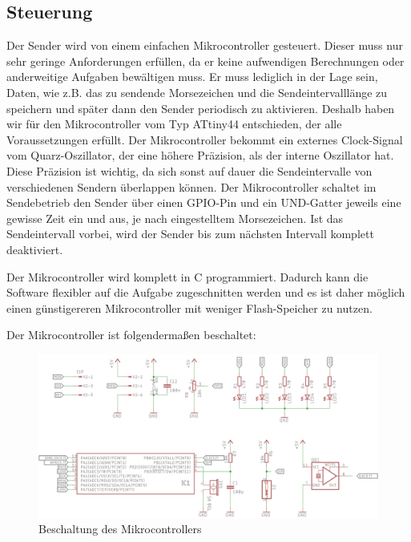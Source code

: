\subsection{Steuerung}
Der Sender wird von einem einfachen Mikrocontroller gesteuert. Dieser muss nur
sehr geringe Anforderungen erfüllen, da er keine aufwendigen Berechnungen oder anderweitige
Aufgaben bewältigen muss. Er muss lediglich in der Lage sein, Daten, wie z.B. das
zu sendende Morsezeichen und die Sendeintervalllänge zu speichern und später dann
den Sender periodisch zu aktivieren. Deshalb haben wir für den Mikrocontroller vom
Typ ATtiny44 entschieden, der alle Voraussetzungen erfüllt. Der Mikrocontroller bekommt
ein externes Clock-Signal vom Quarz-Oszillator, der eine höhere Präzision, als der interne
Oszillator hat. Diese Präzision ist wichtig, da sich sonst auf dauer die Sendeintervalle von
verschiedenen Sendern überlappen können. Der Mikrocontroller schaltet im Sendebetrieb den Sender
über einen GPIO-Pin und ein UND-Gatter jeweils eine gewisse Zeit ein und aus, je nach eingestelltem
Morsezeichen. Ist das Sendeintervall vorbei, wird der Sender bis zum nächsten Intervall komplett
deaktiviert.

Der Mikrocontroller wird komplett in C programmiert. Dadurch kann die Software flexibler auf die Aufgabe zugeschnitten
werden und es ist daher möglich einen günstigereren Mikrocontroller mit weniger Flash-Speicher zu nutzen.

Der Mikrocontroller ist folgendermaßen beschaltet:

\begin{figure}[H]
\includegraphics[scale=0.9]{res/Controller.png}
\caption{Beschaltung des Mikrocontrollers}
\end{figure}


